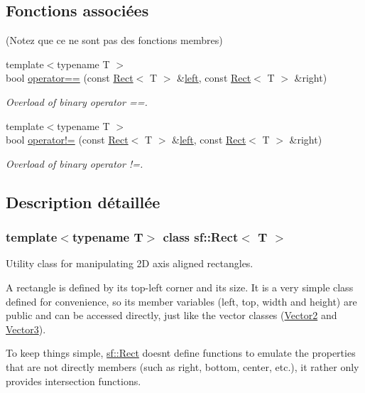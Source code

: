 \subsection*{Fonctions associées}
(Notez que ce ne sont pas des fonctions membres) \begin{DoxyCompactItemize}
\item 
{\footnotesize template$<$typename T $>$ }\\bool \hyperlink{classsf_1_1Rect_ab3488b5dbd0e587c4d7cb80605affc46}{operator==} (const \hyperlink{classsf_1_1Rect}{Rect}$<$ T $>$ \&\hyperlink{classsf_1_1Rect_aa49960fa465103d9cb7069ceb25c7c32}{left}, const \hyperlink{classsf_1_1Rect}{Rect}$<$ T $>$ \&right)
\begin{DoxyCompactList}\small\item\em Overload of binary operator ==. \end{DoxyCompactList}\item 
{\footnotesize template$<$typename T $>$ }\\bool \hyperlink{classsf_1_1Rect_a03fc4c105687b7d0f07b6b4ed4b45581}{operator!=} (const \hyperlink{classsf_1_1Rect}{Rect}$<$ T $>$ \&\hyperlink{classsf_1_1Rect_aa49960fa465103d9cb7069ceb25c7c32}{left}, const \hyperlink{classsf_1_1Rect}{Rect}$<$ T $>$ \&right)
\begin{DoxyCompactList}\small\item\em Overload of binary operator !=. \end{DoxyCompactList}\end{DoxyCompactItemize}


\subsection{Description détaillée}
\subsubsection*{template$<$typename T$>$\newline
class sf\+::\+Rect$<$ T $>$}

Utility class for manipulating 2D axis aligned rectangles. 

A rectangle is defined by its top-\/left corner and its size. It is a very simple class defined for convenience, so its member variables (left, top, width and height) are public and can be accessed directly, just like the vector classes (\hyperlink{classsf_1_1Vector2}{Vector2} and \hyperlink{classsf_1_1Vector3}{Vector3}).

To keep things simple, \hyperlink{classsf_1_1Rect}{sf\+::\+Rect} doesn\textquotesingle{}t define functions to emulate the properties that are not directly members (such as right, bottom, center, etc.), it rather only provides intersection functions.

